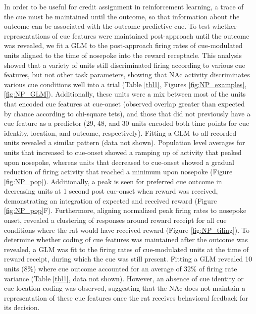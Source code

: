 \documentclass[11pt]{article}
\begin{document}
{In order to be useful for credit assignment in reinforcement learning, a trace
of the cue must be maintained until the outcome, so that information about the
outcome can be associated with the outcome-predictive cue. To test whether
representations of cue features were maintained post-approach until the outcome
was revealed, we fit a GLM to the post-approach firing rates of cue-modulated
units aligned to the time of nosepoke into the reward receptacle. This analysis
showed that a variety of units still discriminated firing according to various
cue features, but not other task parameters, showing that NAc activity
discriminates various cue conditions well into a trial (Table \ref{tbl1},
Figures \ref{fig:NP_examples},\ref{fig:NP_GLM}). Additionally, these units were
a mix between most of the units that encoded cue features at cue-onset (observed
overlap greater than expected by chance according to chi-square tets), and those
that did not previously have a cue feature as a predictor (29, 48, and 30 units
encoded both time points for cue identity, location, and outcome,
respectively). Fitting a GLM to all recorded units revealed a similar pattern
(data not shown). Population level averages for units that increased to
cue-onset showed a ramping up of activity that peaked upon nosepoke, whereas
units that decreased to cue-onset showed a gradual reduction of firing activity
that reached a minimum upon nosepoke (Figure \ref{fig:NP_pop}). Additionally, a
peak is seen for preferred cue outcome in decreasing units at 1 second post
cue-onset when reward was received, demonstrating an integration of expected and
received reward (Figure \ref{fig:NP_pop}F). Furthermore, aligning normalized
peak firing rates to nosepoke onset, revealed a clustering of responses around
reward receipt for all cue conditions where the rat would have received reward
(Figure \ref{fig:NP_tiling}). To determine whether coding of cue features was
maintained after the outcome was revealed, a GLM was fit to the firing rates of
cue-modulated units at the time of reward receipt, during which the cue was
still present. Fitting a GLM revealed 10 units (8\%) where cue outcome accounted
for an average of 32\% of firing rate variance (Table \ref{tbl1}, data not
shown). However, an absence of cue identity or cue location coding was observed,
suggesting that the NAc does not maintain a representation of these cue features
once the rat receives behavioral feedback for its decision.

}
\end{document}
